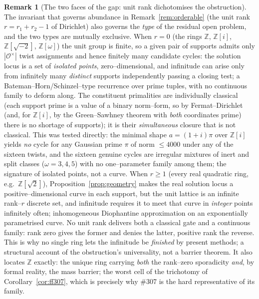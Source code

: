 \documentclass[11pt]{article}
\theoremstyle{definition}
\newtheorem{remark}[theorem]{Remark}
\begin{document}
\begin{remark}[The two faces of the gap: unit rank dichotomises the obstruction]\label{rem:dichotomy}
The invariant that governs abundance in Remark~\ref{rem:orderable} (the unit rank
$r=r_1+r_2-1$ of Dirichlet) also governs the \emph{type} of the residual open problem, and the two
types are mutually exclusive. When $r=0$ (the rings $\mathbb{Z}$, $\mathbb{Z}[i]$,
$\mathbb{Z}[\sqrt{-2}]$, $\mathbb{Z}[\omega]$) the unit group is finite, so a given pair of supports
admits only $|\mathcal{O}^\times|$ twist assignments and hence finitely many candidate cycles: the
solution locus is a set of \emph{isolated points}, zero--dimensional, and infinitude can arise only from
infinitely many \emph{distinct} supports independently passing a closing test; a
Bateman--Horn/Schinzel--type recurrence over prime tuples, with no continuous family to deform along.
The constituent primalities are individually classical (each support prime is a value of a binary
norm--form, so by Fermat--Dirichlet (and, for $\mathbb{Z}[i]$, by the Green--Sawhney theorem with
\emph{both} coordinates prime) there is no shortage of supports); it is their \emph{simultaneous}
closure that is not classical. This was tested directly: the minimal shape $a=(1+i)\pi$ over
$\mathbb{Z}[i]$ yields \emph{no} cycle for any Gaussian prime $\pi$ of norm $\le4000$ under any of the
sixteen twists, and the sixteen genuine cycles are irregular mixtures of inert and split classes
($\omega=3,4,5$) with no one--parameter family among them; the signature of isolated points, not a
curve. When $r\ge1$ (every real quadratic ring, e.g.\ $\mathbb{Z}[\sqrt2]$),
Proposition~\ref{prop:geometry} makes the real solution locus a positive--dimensional curve in each
support, but the unit lattice is an infinite rank--$r$ discrete set, and infinitude requires it to meet
that curve in \emph{integer} points infinitely often; inhomogeneous Diophantine approximation on an
exponentially parametrised curve. No unit rank delivers both a classical gate and a continuous family:
rank zero gives the former and denies the latter, positive rank the reverse. This is why no single ring
lets the infinitude be \emph{finished} by present methods; a structural account of the obstruction's
universality, not a barrier theorem. It also locates $\mathbb{Z}$ exactly: the unique ring carrying
\emph{both} the rank--zero sporadicity \emph{and}, by formal reality, the mass barrier; the worst
cell of the trichotomy of Corollary~\ref{cor:ff307}, which is precisely why \#307 is the hard
representative of its family.
\end{remark}
\end{document}
